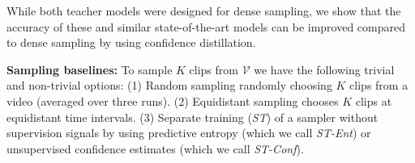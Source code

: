 \documentclass[a4paper,conference]{IEEEtran}
\begin{document}
\begin{table}[h]
\begin{center}
{}
\end{center}
\caption{Models overview.\vspace{-0.05in}}
\label{experiments:models}
\vspace{-0.05in}
\end{table}

While both teacher models were designed for dense sampling, we show that the accuracy of these and similar state-of-the-art models can be improved compared to dense sampling by using confidence distillation.

{\bf Sampling baselines:} To sample $K$ clips from $\mathcal{V}$ we have the following trivial and non-trivial options: (1) Random sampling randomly choosing $K$ clips from a video (averaged over three runs). (2) Equidistant sampling chooses $K$ clips at equidistant time intervals. (3) Separate training (\textit{ST}) of a sampler without supervision signals by using predictive entropy (which we call \textit{ST-Ent}) or unsupervised confidence estimates \cite{devries2018learning} (which we call \textit{ST-Conf}). 
\end{document}
